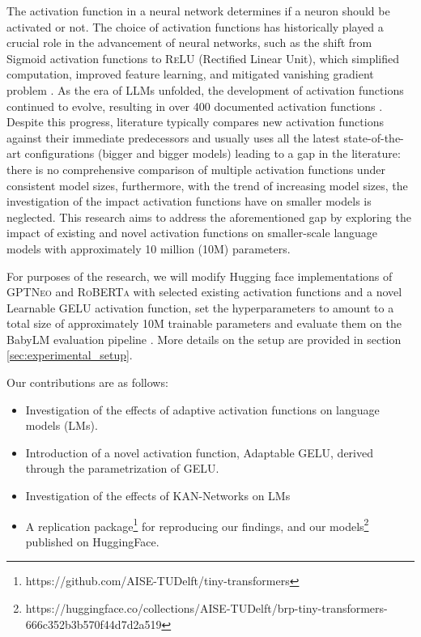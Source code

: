 The activation function in a neural network determines if a neuron should be activated or not. The choice of activation functions has historically played a crucial role in the advancement of neural networks, such as the shift from Sigmoid activation functions to \textsc{ReLU} (Rectified Linear Unit), which simplified computation, improved feature learning, and mitigated vanishing gradient problem \cite{nair2010rectified}. As the era of LLMs unfolded, the development of activation functions continued to evolve, resulting in over 400 documented activation functions \cite{Kunc2024}. Despite this progress, literature typically compares new activation functions against their immediate predecessors and usually uses all the latest state-of-the-art configurations (bigger and bigger models) leading to a gap in the literature: there is no comprehensive comparison of multiple activation functions under consistent model sizes, furthermore, with the trend of increasing model sizes, the investigation of the impact activation functions have on smaller models is neglected. This research aims to address the aforementioned gap by exploring the impact of existing and novel activation functions on smaller-scale language models with approximately 10 million (10M) parameters. 

For purposes of the research, we will modify Hugging face implementations of \textsc{GPTNeo} \cite{huggingfaceNEO} and \textsc{RoBERTa} \cite{huggingfaceRoberta} with selected existing activation functions and a novel Learnable GELU activation function, set the hyperparameters to amount to a total size of approximately 10M trainable parameters and evaluate them on the BabyLM evaluation pipeline \cite{Warstadt2023}. More details on the setup are provided in section \ref{sec:experimental_setup}.


\noindent Our contributions are as follows:

\begin{itemize}

    \item Investigation of the effects of adaptive activation functions on language models (LMs).
    \item Introduction of a novel activation function, Adaptable GELU, derived through the parametrization of GELU.
    \item Investigation of the effects of KAN-Networks on LMs
    \item A replication package\footnote{https://github.com/AISE-TUDelft/tiny-transformers} for reproducing our findings, and our models\footnote{https://huggingface.co/collections/AISE-TUDelft/brp-tiny-transformers-666c352b3b570f44d7d2a519} published on HuggingFace.

\end{itemize}